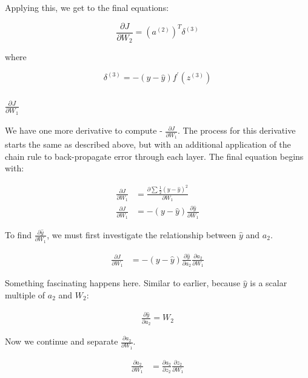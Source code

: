 \documentclass[]{article}
\begin{document}
Applying this, we get to the final equations:

\begin{equation}
\frac{\partial J}{\partial W_2} =
(a^{(2)})^T\delta^{(3)}\tag{6}
\end{equation}

where

\begin{equation}
\delta^{(3)} = -(y-\hat{y}) f^\prime(z^{(3)})
\end{equation}

\subsubsection{$\frac{\partial J}{\partial W_1}$}

We have one more derivative to compute - $\frac{\partial J}{\partial W_1}$. The process for this derivative starts the same as described above, but with an additional application of the chain rule to back-propagate error through each layer. The final equation begins with:

\begin{align}
	\frac{\partial J}{\partial W_1} &= \frac{\partial \sum \frac{1}{2}(y-\hat{y})^2}{\partial W_1} \\
	\frac{\partial J}{\partial W_1} &= -(y-\hat{y}) \frac{\partial \hat{y}}{\partial W_1}
\end{align}

To find $\frac{\partial \hat{y}}{\partial W_1}$, we must first investigate the relationship between $\hat{y}$ and $a_2$.

\begin{align}
	\frac{\partial J}{\partial W_1} &= -(y-\hat{y}) \frac{\partial \hat{y}}{\partial a_2} \frac{\partial a_2}{\partial W_1}
\end{align}

Something fascinating happens here. Similar to earlier, because $\hat{y}$ is a scalar multiple of $a_2$ and $W_2$:

\begin{align}
	\frac{\partial \hat{y}}{\partial a_2} = W_2
\end{align}

Now we continue and separate $\frac{\partial a_2}{\partial W_1}$.

\begin{align}
	\frac{\partial a_2}{\partial W_1} &= \frac{\partial a_2}{\partial z_2} \frac{\partial z_2}{\partial W_1}
\end{align}
\end{document}

